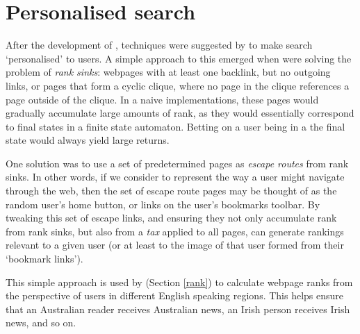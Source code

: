 \section{Personalised search}
After the development of \pr{} \cite{page1998}, techniques
were suggested by  to make search `personalised' to users.
A simple approach to this emerged when \citeauthor{page1999} were
solving the
problem of {\it rank sinks}: webpages with at least one backlink, but
no outgoing links, or pages that form a cyclic clique, where no page
in the clique references a page outside of the clique.  In a naive
\pr{} implementations, these pages would gradually accumulate large
amounts of rank, as they would essentially correspond to final states
in a finite state automaton.  Betting on a user being in a
the final state would always yield large returns.

One solution was
to use a set of predetermined pages as {\it escape routes} from rank
sinks.  In other words, if we consider \pr{} to represent the way a
user might navigate through the web, then the set of escape route pages
may be thought of as the random user's home button, or links on the user's
bookmarks toolbar. By tweaking this set of escape links, and ensuring
they not only accumulate rank from rank sinks, but also from a {\it tax}
applied to all pages, \pr{} can generate rankings relevant to a
given user (or at least to the image of that user formed from their
`bookmark links').

This simple approach is used by \nr{}
(Section \ref{rank}) to calculate webpage ranks from the perspective
of users in different English speaking regions.  This helps ensure that an
Australian reader receives Australian news, an Irish person receives
Irish news, and so on.

